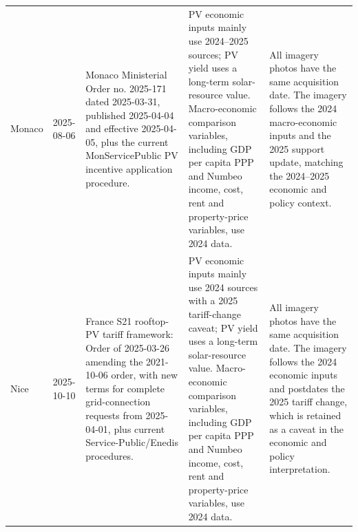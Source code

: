 {\begin{longtable}{@{}p{}p{}p{}p{}p{}@{}}
Monaco & 2025-08-06 & Monaco Ministerial Order no. 2025-171 dated 2025-03-31, published 2025-04-04 and effective 2025-04-05, plus the current MonServicePublic PV incentive application procedure. & PV economic inputs mainly use 2024--2025 sources; PV yield uses a long-term solar-resource value. Macro-economic comparison variables, including GDP per capita PPP and Numbeo income, cost, rent and property-price variables, use 2024 data. & All imagery photos have the same acquisition date. The imagery follows the 2024 macro-economic inputs and the 2025 support update, matching the 2024--2025 economic and policy context. \\
Nice & 2025-10-10 & France S21 rooftop-PV tariff framework: Order of 2025-03-26 amending the 2021-10-06 order, with new terms for complete grid-connection requests from 2025-04-01, plus current Service-Public/Enedis procedures. & PV economic inputs mainly use 2024 sources with a 2025 tariff-change caveat; PV yield uses a long-term solar-resource value. Macro-economic comparison variables, including GDP per capita PPP and Numbeo income, cost, rent and property-price variables, use 2024 data. & All imagery photos have the same acquisition date. The imagery follows the 2024 economic inputs and postdates the 2025 tariff change, which is retained as a caveat in the economic and policy interpretation. \\
\bottomrule
\end{longtable}
}
